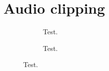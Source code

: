 \section{Audio clipping}

\begin{figure}[H]
\centering
\begin{subfigure}[b]{0.47\textwidth}
	
	\caption{Test.}
	\label{fig:clippingClean}
\end{subfigure}
\hspace{6mm} 
\begin{subfigure}[b]{0.47\textwidth}
	
	\caption{Test.}
	\label{fig:clippingDist}
\end{subfigure}
\end{figure}


%	
%	
